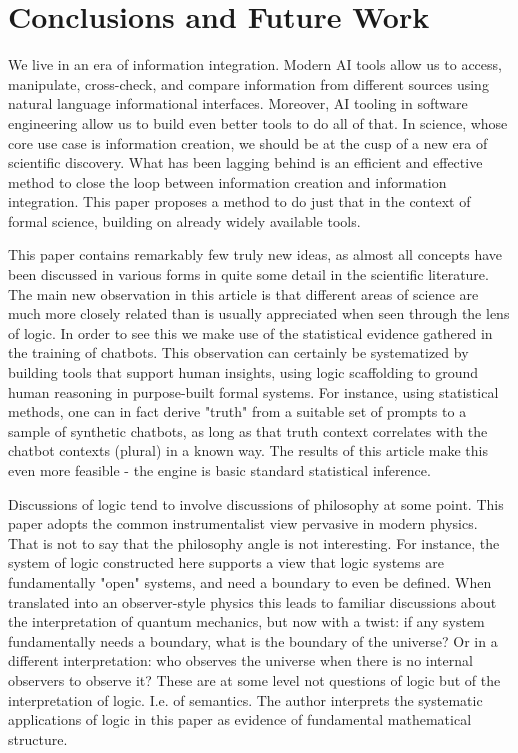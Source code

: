 \section{Conclusions and Future Work}
\label{sec:conclusion}

We live in an era of information integration. Modern AI tools allow us to access, manipulate, cross-check, and compare information from different sources using natural language informational interfaces. Moreover, AI tooling in software engineering allow us to build even better tools to do all of that. In science, whose core use case is information creation, we should be at the cusp of a new era of scientific discovery. What has been lagging behind is an efficient and effective method to close the loop between information creation and information integration. This paper proposes a method to do just that in the context of formal science, building on already widely available tools.

This paper contains remarkably few truly new ideas, as almost all concepts have been discussed in various forms in quite some detail in the scientific literature. The main new observation in this article is that different areas of science are much more closely related than is usually appreciated when seen through the lens of logic. In order to see this we make use of the statistical evidence gathered in the training of chatbots. This observation can certainly be systematized by building tools that support human insights, using logic scaffolding to ground human reasoning in purpose-built formal systems. For instance, using statistical methods, one can in fact derive "truth" from a suitable set of prompts to a sample of synthetic chatbots, as long as that truth context correlates with the chatbot contexts (plural) in a known way. The results of this article make this even more feasible - the engine is basic standard statistical inference. 

Discussions of logic tend to involve discussions of philosophy at some point. This paper adopts the common instrumentalist view pervasive in modern physics. That is not to say that the philosophy angle is not interesting. For instance, the system of logic constructed here supports a view that logic systems are fundamentally "open" systems, and need a boundary to even be defined. When translated into an observer-style physics this leads to familiar discussions about the interpretation of quantum mechanics, but now with a twist: if any system fundamentally needs a boundary, what is the boundary of the universe? Or in a different interpretation: who observes the universe when there is no internal observers to observe it? These are at some level not questions of logic but of the interpretation of logic. I.e. of semantics. The author interprets the systematic applications of logic in this paper as evidence of fundamental mathematical structure.




